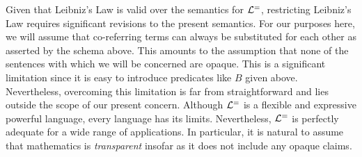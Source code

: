 Given that Leibniz's Law is valid over the semantics for $\mathcal{L}^{=}$, restricting Leibniz's Law requires significant revisions to the present semantics.
For our purposes here, we will assume that co-referring terms can always be substituted for each other as asserted by the schema above.
This amounts to the assumption that none of the sentences with which we will be concerned are opaque.
This is a significant limitation since it is easy to introduce predicates like $B$ given above. 
Nevertheless, overcoming this limitation is far from straightforward and lies outside the scope of our present concern.
Although $\mathcal{L}^{=}$ is a flexible and expressive powerful language, every language has its limits.
Nevertheless, $\mathcal{L}^{=}$ is perfectly adequate for a wide range of applications. 
In particular, it is natural to assume that mathematics is \textit{transparent} insofar as it does not include any opaque claims.









\iffalse

\practiceproblems

